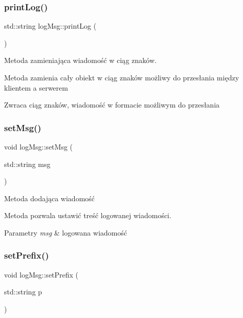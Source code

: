 \subsubsection{\texorpdfstring{print\+Log()}{printLog()}}
{\footnotesize\ttfamily std\+::string log\+Msg\+::print\+Log (\begin{DoxyParamCaption}{ }\end{DoxyParamCaption})}



Metoda zamieniająca wiadomość w ciąg znaków. 

Metoda zamienia cały obiekt w ciąg znaków możliwy do przesłania między klientem a serwerem \begin{DoxyReturn}{Zwraca}
ciąg znaków, wiadomość w formacie możliwym do przesłania 
\end{DoxyReturn}
\mbox{\label{classlog_msg_a329a01a7f2b71cd3adbc0aa637169a65}} 
\subsubsection{\texorpdfstring{set\+Msg()}{setMsg()}}
{\footnotesize\ttfamily void log\+Msg\+::set\+Msg (\begin{DoxyParamCaption}\item[{std\+::string}]{msg }\end{DoxyParamCaption})}



Metoda dodająca wiadomość 

Metoda pozwala ustawić treść logowanej wiadomości. 
\begin{DoxyParams}{Parametry}
{\em msg} & logowana wiadomość \\
\hline
\end{DoxyParams}
\mbox{\label{classlog_msg_a11cdf7b82dc82b369a5d62b721b27e46}} 
\subsubsection{\texorpdfstring{set\+Prefix()}{setPrefix()}}
{\footnotesize\ttfamily void log\+Msg\+::set\+Prefix (\begin{DoxyParamCaption}\item[{std\+::string}]{p }\end{DoxyParamCaption})}



